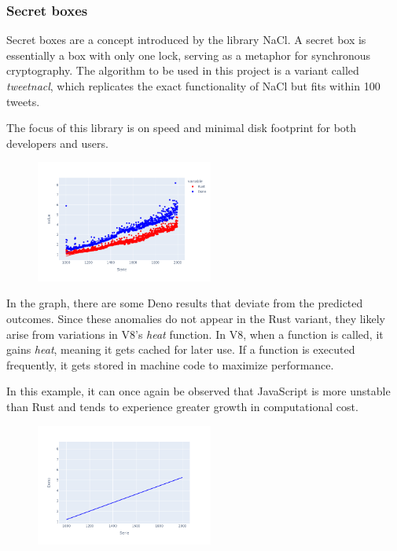\documentclass[10pt,journal,compsoc]{IEEEtran}
\begin{document}
\subsubsection{Secret boxes}

Secret boxes are a concept introduced by the library NaCl. A secret box is essentially a box with only one lock, serving as a metaphor for synchronous cryptography. The algorithm to be used in this project is a variant called \textit{tweetnacl}, which replicates the exact functionality of NaCl but fits within 100 tweets.

The focus of this library is on speed and minimal disk footprint for both developers and users.

\begin{figure}[H]
    \centering
    \includegraphics[width=0.52\textwidth]{images/secretbox_lines}
\end{figure}

In the graph, there are some Deno results that deviate from the predicted outcomes. Since these anomalies do not appear in the Rust variant, they likely arise from variations in V8's \textit{heat} function. In V8, when a function is called, it gains \textit{heat}, meaning it gets cached for later use. If a function is executed frequently, it gets stored in machine code to maximize performance.

In this example, it can once again be observed that JavaScript is more unstable than Rust and tends to experience greater growth in computational cost.

\begin{figure}[H]
    \centering
    \includegraphics[width=0.52\textwidth]{trend_secretbox_deno}
\end{figure}
\end{document}

